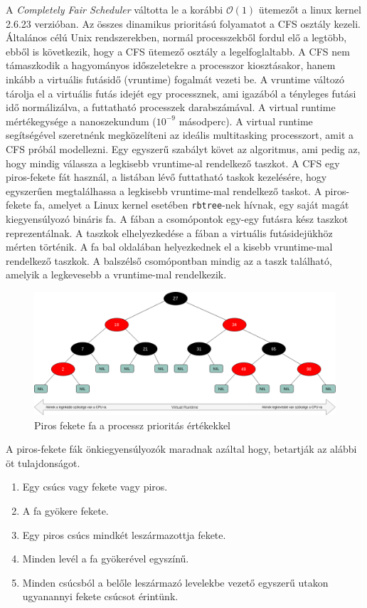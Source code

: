 

A \textit{Completely Fair Scheduler} váltotta le a korábbi $\mathcal{O}(1)$ ütemezőt a linux kernel 2.6.23 verzióban.
Az összes dinamikus prioritású folyamatot a CFS osztály kezeli. Általános célú Unix rendszerekben, normál processzekből fordul elő a legtöbb, ebből is következik, hogy a CFS ütemező osztály a legelfoglaltabb.
A CFS nem támaszkodik a hagyományos időszeletekre a processzor kiosztásakor, hanem inkább a virtuális futásidő (vruntime) fogalmát vezeti be.
A vruntime változó tárolja el a virtuális futás idejét egy processznek, ami igazából a tényleges futási idő normálizálva, a futtatható processzek darabszámával.
A virtual runtime mértékegysége a nanoszekundum ($10^{-9}$ másodperc).
A virtual runtime segítségével szeretnénk megközelíteni az ideális multitasking processzort, amit a CFS próbál modellezni. Egy egyszerű szabályt követ az algoritmus, ami pedig az, hogy mindig válassza a legkisebb vruntime-al rendelkező taszkot. A CFS egy piros-fekete fát használ, a listában lévő futtatható taskok kezelésére, hogy egyszerűen megtalálhassa a legkisebb vruntime-mal rendelkező taskot.
A piros-fekete fa, amelyet a Linux kernel esetében \texttt{rbtree}-nek hívnak, egy saját magát kiegyensúlyozó bináris fa.
A fában a csomópontok egy-egy futásra kész taszkot reprezentálnak. A taszkok elhelyezkedése a fában a virtuális futásidejükhöz mérten történik. 
A fa bal oldalában helyezkednek el a kisebb vruntime-mal rendelkező taszkok.
A balszélső csomópontban mindig az a taszk található, amelyik a legkevesebb a vruntime-mal rendelkezik.
\begin{figure}[h]
\centering
\includegraphics[width=\textwidth]{images/redBlackTree.png}
\caption{Piros fekete fa a processz prioritás értékekkel}
\label{fig:rb_tree}
\end{figure}

\noindent A piros-fekete fák önkiegyensúlyozók maradnak azáltal hogy, betartják az alábbi öt tulajdonságot.
\begin{enumerate}
	\item Egy csúcs vagy fekete vagy piros.
	\item A fa gyökere fekete.
	\item Egy piros csúcs mindkét leszármazottja fekete.
	\item Minden levél a fa gyökerével egyszínű. 
	\item Minden csúcsból a belőle leszármazó levelekbe vezető egyszerű utakon ugyanannyi fekete csúcsot érintünk.
\end{enumerate}

